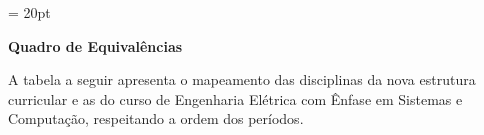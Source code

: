 \documentclass[oneside,envcountsame,envcountchap,openany]{svmono}
\renewcommand{\arraystretch}{1.5}
\begin{document}
\thispagestyle{firstpage} %
\headsep = 20pt
\setlength{\tabcolsep}{5pt} %
\vspace*{2.0cm}

\pagestyle{plain} %

\begin{center}
  \textbf{\LARGE Quadro de Equivalências}
\end{center}
\vspace*{0.5cm}
A tabela a seguir apresenta o mapeamento das disciplinas da nova estrutura curricular e as do curso de Engenharia Elétrica com Ênfase em Sistemas e Computação, respeitando a ordem dos períodos.
\renewcommand{\arraystretch}{1.5}
\end{document}
